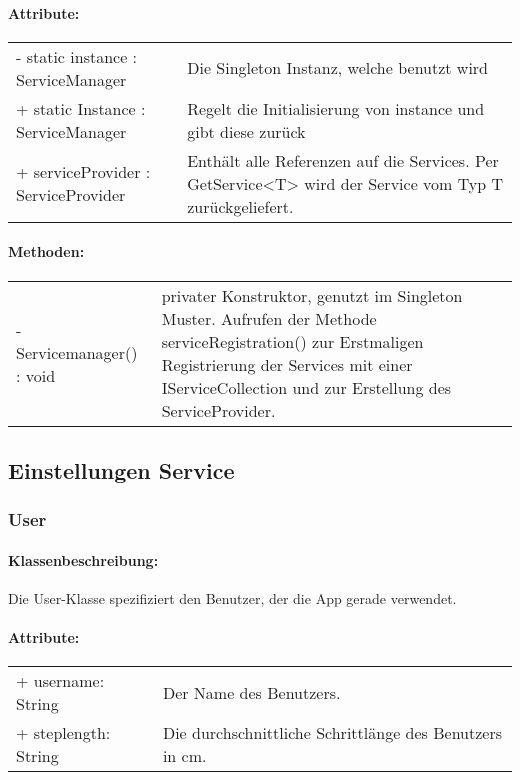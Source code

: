 \documentclass[a4paper,12pt]{article}
\begin{document}
	\paragraph{Attribute:}
	\begin{tabular}{p{7cm}p{10cm}}
		- static instance : ServiceManager & Die Singleton Instanz, welche benutzt wird \\
		+ static Instance : ServiceManager & Regelt die Initialisierung von instance und gibt diese zurück\\
		+ serviceProvider : ServiceProvider & Enthält alle Referenzen auf die Services. Per GetService<T> wird der Service vom Typ T zurückgeliefert.\\
	\end{tabular}
	\paragraph{Methoden:}
	\begin{tabular}{p{7cm}p{10cm}}
		- Servicemanager() : void & privater Konstruktor, genutzt im Singleton Muster. Aufrufen der Methode serviceRegistration() zur Erstmaligen Registrierung der Services mit einer IServiceCollection und zur Erstellung des ServiceProvider.\\
	\end{tabular}
		
\subsection{Einstellungen Service}
\subsubsection{User}
    \paragraph{Klassenbeschreibung:}
    Die User-Klasse spezifiziert den Benutzer, der die App gerade verwendet.\\
    \paragraph{Attribute:}
    \begin{tabular}{p{5cm}p{12cm}}
        + username: String & Der Name des Benutzers.\\
        + steplength: String & Die durchschnittliche Schrittlänge des Benutzers in cm.\\
    \end{tabular}
\end{document}
